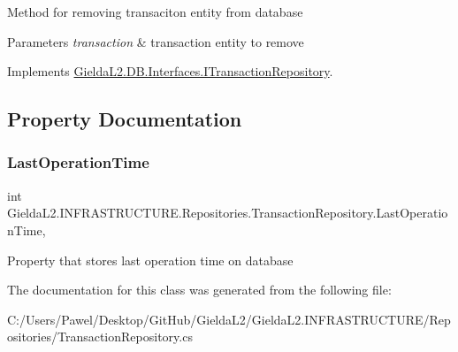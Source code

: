Method for removing transaciton entity from database 


\begin{DoxyParams}{Parameters}
{\em transaction} & transaction entity to remove\\
\hline
\end{DoxyParams}


Implements \mbox{\hyperlink{interface_gielda_l2_1_1_d_b_1_1_interfaces_1_1_i_transaction_repository_a6bd6442beda16c8af22a14457f1c6cc5}{Gielda\+L2.\+D\+B.\+Interfaces.\+I\+Transaction\+Repository}}.



\subsection{Property Documentation}
\mbox{\label{class_gielda_l2_1_1_i_n_f_r_a_s_t_r_u_c_t_u_r_e_1_1_repositories_1_1_transaction_repository_aac4f791168cb10869951f5f883895ad3}} 
\subsubsection{\texorpdfstring{LastOperationTime}{LastOperationTime}}
{\footnotesize\ttfamily int Gielda\+L2.\+I\+N\+F\+R\+A\+S\+T\+R\+U\+C\+T\+U\+R\+E.\+Repositories.\+Transaction\+Repository.\+Last\+Operation\+Time\hspace{0.3cm}{\ttfamily [get]}, {\ttfamily [set]}}



Property that stores last operation time on database 



The documentation for this class was generated from the following file\+:\begin{DoxyCompactItemize}
\item 
C\+:/\+Users/\+Pawel/\+Desktop/\+Git\+Hub/\+Gielda\+L2/\+Gielda\+L2.\+I\+N\+F\+R\+A\+S\+T\+R\+U\+C\+T\+U\+R\+E/\+Repositories/Transaction\+Repository.\+cs\end{DoxyCompactItemize}
